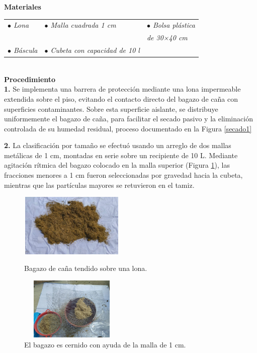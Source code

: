 \documentclass[12pt]{article}
\begin{document}
			
			\textbf{Materiales} \\[0.5em]
			
			
			\begin{tabular}{p{0.3\textwidth}p{}p{}}
			\textit{	$\bullet$ Lona} &  \textit{$\bullet$  Malla cuadrada 1 cm} & \textit{$\bullet$ Bolsa plástica  }\\
				&&\textit{de 30×40 cm} \\
				\textit{$\bullet$ Báscula} & \textit{$\bullet$ Cubeta con capacidad de 10 l} & 
			\end{tabular}
		\\[0.5em]
			
			
			\textbf{Procedimiento}
			\\[0.5em]
			\textbf{1.} Se implementa una barrera de protección mediante una lona impermeable extendida sobre el piso, evitando el contacto directo del bagazo de caña con superficies contaminantes. Sobre esta superficie aislante, se distribuye uniformemente el bagazo de caña, para facilitar el secado pasivo y la eliminación controlada de su humedad residual, proceso documentado en la Figura \ref{secado1}

			
			\textbf{2.}	La clasificación por tamaño se efectuó usando un arreglo de dos mallas metálicas de 1 cm, montadas en serie sobre un recipiente de 10 L. Mediante agitación rítmica del bagazo colocado en la malla superior (Figura \ref{cernir_bagazo_B}), las fracciones menores a 1 cm fueron seleccionadas por gravedad hacia la cubeta, mientras que las partículas mayores se retuvieron en el tamiz.
		
			
				\begin{figure}[H]
				\centering
				\begin{minipage}{0.46\textwidth}
					\centering
					\includegraphics[width=5cm, height=3cm]{imagenes/secado de bagazo} %
					\caption{Bagazo de caña tendido sobre una lona.}
					\label{secado1}
				\end{minipage}
				\hfill
				\begin{minipage}{0.48\textwidth}
					\centering
					\includegraphics[width=5cm, height=3cm]{imagenes/cernir_bagazo_1} %
					\caption{El bagazo es cernido con ayuda de la malla de 1 cm.}
					\label{cernir_bagazo_B}
				\end{minipage}
			\end{figure}
			
\end{document}
